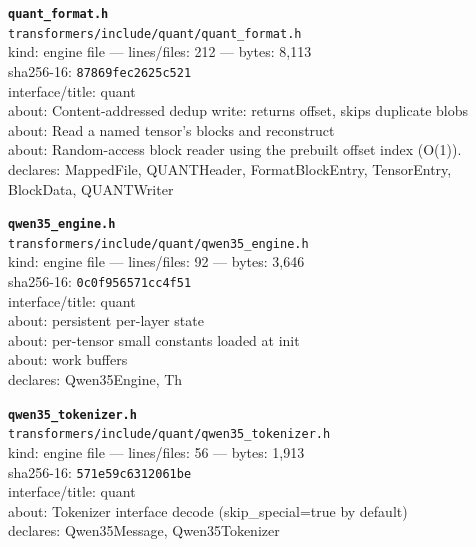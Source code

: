 \noindent\textbf{\texttt{quant\_format.h}}\\
\texttt{transformers/include/quant/quant\_format.h}\\
kind: engine file --- lines/files: 212 --- bytes: 8,113\\
sha256-16: \texttt{87869fec2625c521}\\
interface/title: quant\\
about: Content-addressed dedup write: returns offset, skips duplicate blobs\\
about: Read a named tensor's blocks and reconstruct\\
about: Random-access block reader using the prebuilt offset index (O(1)).\\
declares: MappedFile, QUANTHeader, FormatBlockEntry, TensorEntry, BlockData, QUANTWriter\\
\vspace*{6.0pt}

\noindent\textbf{\texttt{qwen35\_engine.h}}\\
\texttt{transformers/include/quant/qwen35\_engine.h}\\
kind: engine file --- lines/files: 92 --- bytes: 3,646\\
sha256-16: \texttt{0c0f956571cc4f51}\\
interface/title: quant\\
about: persistent per-layer state\\
about: per-tensor small constants loaded at init\\
about: work buffers\\
declares: Qwen35Engine, Th\\
\vspace*{6.0pt}

\noindent\textbf{\texttt{qwen35\_tokenizer.h}}\\
\texttt{transformers/include/quant/qwen35\_tokenizer.h}\\
kind: engine file --- lines/files: 56 --- bytes: 1,913\\
sha256-16: \texttt{571e59c6312061be}\\
interface/title: quant\\
about: Tokenizer interface decode (skip\_special=true by default)\\
declares: Qwen35Message, Qwen35Tokenizer\\
\vspace*{6.0pt}

